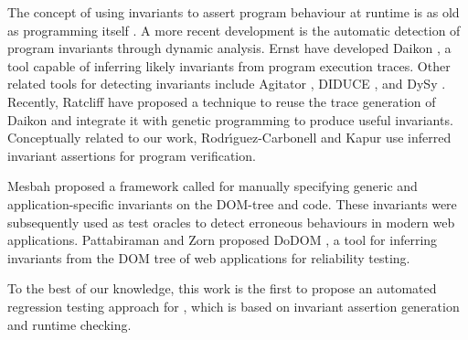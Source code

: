 The concept of using invariants to assert program behaviour at runtime is as old as programming itself \cite{Clarke:2006}. A more recent development is the automatic detection of program invariants through dynamic analysis. Ernst \etal have developed Daikon \cite{ernst2007daikon}, a tool capable of inferring likely invariants from program execution traces. Other related tools for detecting invariants include Agitator \cite{agitator:issta06}, DIDUCE \cite{Hangal02trackingdown}, and DySy \cite{Csallner08dysy}. Recently, Ratcliff \etal \cite{ratcliff:gecco11} have proposed a technique to reuse the trace generation of Daikon and integrate it with genetic programming to produce useful invariants.  %
Conceptually related to our work, Rodr{\'\i}guez-Carbonell and Kapur \cite{rodrikapurICTAC04} use  inferred invariant assertions for program verification.

Mesbah \etal \cite{mesbah:tse12} proposed a framework called \atusa for manually specifying generic and application-specific invariants on the DOM-tree and \javascript code. These invariants were subsequently used as test oracles to detect erroneous behaviours in modern web applications. Pattabiraman and Zorn proposed DoDOM \cite{dodom:2010}, a tool for inferring invariants from the DOM tree of web applications for reliability testing.

To the best of our knowledge, this work is the first to propose an automated regression testing approach for \javascript, which is based on  \javascript invariant assertion generation and runtime checking.



